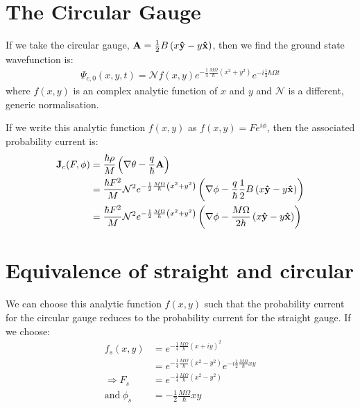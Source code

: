 \documentclass{article}
\begin{document}
\section{The Circular Gauge}

If we take the circular gauge, $\mathbf{A} = \frac{1}{2} B \left( x \mathbf{ \hat{ y }} -
y \mathbf{ \hat{ x }} \right)$, then we find the ground state wavefunction is:
\begin{align}
    \Psi_{c,0}(x,y,t) = \mathcal{N} f(x,y)
        e^{- \frac{1}{4}\frac{M\Omega}{\hbar} \left( x^2 + y^2 \right)}
        e^{- i \frac{1}{2} \hbar \Omega t}
\end{align}
where $f(x,y)$ is an complex analytic function of $x$ and $y$ and $\mathcal{N}$
is a different, generic normalisation.

If we write this analytic function $f(x,y)$ as $f(x,y) = F e^{i \phi}$, then the
associated probability current is:
\begin{align}
    \mathbf{J}_c(F, \phi) &= \frac{\hbar \rho}{M} \left( \nabla \theta - \frac{q}{\hbar}
        \mathbf{A} \right) \\
    &= \frac{\hbar F^2}{M} \mathcal{N}^2 e^{- \frac{1}{2} \frac{M \Omega}{\hbar} \left( x^2 + y^2
       \right)} \left( \nabla \phi - \frac{q}{\hbar} \frac{1}{2} B \left( x\mathbf{ \hat{ y }} -
       y\mathbf{ \hat{ x }} \right) \right) \\
       &= \frac{\hbar F^2}{M} \mathcal{N}^2 e^{- \frac{1}{2} \frac{M \Omega}{\hbar} \left( x^2 + y^2
       \right)} \left( \nabla \phi - \frac{M \Omega}{2 \hbar} \left( x\mathbf{ \hat{ y }} -
       y\mathbf{ \hat{ x }} \right) \right)
\end{align}

\section{Equivalence of straight and circular}

We can choose this analytic function $f(x,y)$ such that the probability current
for the circular gauge reduces to the probability current for the straight
gauge. If we choose:
\begin{align}
    f_s(x,y) &= e^{- \frac{1}{4} \frac{M \Omega}{\hbar} \left( x + i y \right)^2}
    \\
    &= e^{- \frac{1}{4} \frac{M \Omega}{\hbar} \left( x^2 - y^2 \right)}
        e^{- i \frac{1}{2} \frac{M \Omega}{\hbar} xy} \\
        \Rightarrow F_s &= e^{- \frac{1}{4} \frac{M \Omega}{\hbar} \left( x^2 - y^2
    \right)} \\
    \textrm{and}~ \phi_s &= -\frac{1}{2} \frac{M \Omega}{\hbar} xy
\end{align}
\end{document}
